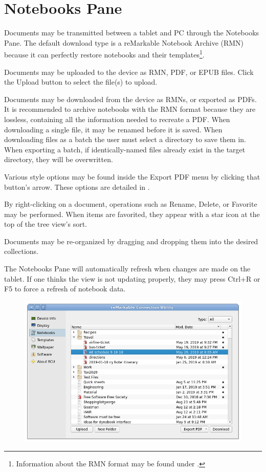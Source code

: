 \documentclass{memoir}
\begin{document}
{\newpage
\section{Notebooks Pane}
\label{sec:notebookspane}
Documents may be transmitted between a tablet and PC through the Notebooks Pane. The default download type is a reMarkable Notebook Archive (RMN) because it can perfectly restore notebooks and their templates\footnote{Information about the RMN format may be found under .}.

Documents may be uploaded to the device as RMN, PDF, or EPUB files. Click the Upload button to select the file(s) to upload.

Documents may be downloaded from the device as RMNs, or exported as PDFs. It is recommended to archive notebooks with the RMN format because they are lossless, containing all the information needed to recreate a PDF. When downloading a single file, it may be renamed before it is saved. When downloading files as a batch the user must select a directory to save them in. When exporting a batch, if identically-named files already exist in the target directory, they will be overwritten.

Various style options may be found inside the Export PDF menu by clicking that button's arrow. These options are detailed in .

By right-clicking on a document, operations such as Rename, Delete, or Favorite may be performed. When items are favorited, they appear with a star icon at the top of the tree view's sort.

Documents may be re-organized by dragging and dropping them into the desired collections.

The Notebooks Pane will automatically refresh when changes are made on the tablet. If one thinks the view is not updating properly, they may press Ctrl+R or F5 to force a refresh of notebook data.

\vfill

\begin{figure}[h]
  \centering
  \includegraphics[width=\linewidth]{images/notebooks.png}
  \caption{}
  \label{fig:notebookspane}
\end{figure}

}
\end{document}
